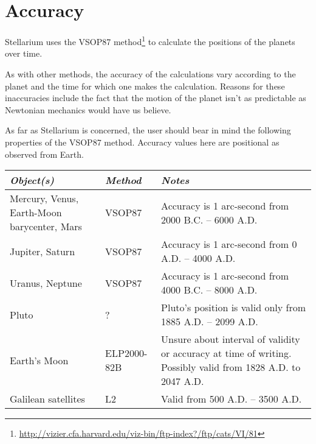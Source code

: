 


\chapter{Accuracy}
\label{ch:Accuracy}
Stellarium uses the VSOP87
method\footnote{\url{http://vizier.cfa.harvard.edu/viz-bin/ftp-index?/ftp/cats/VI/81}}
to calculate the positions of the planets over time.

As with other methods, the accuracy of the calculations vary according
to the planet and the time for which one makes the calculation. Reasons
for these inaccuracies include the fact that the motion of the planet
isn't as predictable as Newtonian mechanics would have us believe.

As far as Stellarium is concerned, the user should bear in mind the
following properties of the VSOP87 method. Accuracy values here are
positional as observed from Earth.

\begin{longtabu} to \textwidth {X|l|X}
\toprule
\emph{Object(s)} & \emph{Method} & \emph{Notes}\tabularnewline
\midrule
Mercury, Venus, Earth-Moon barycenter, Mars & VSOP87 & Accuracy is 1 arc-second from 2000 B.C. -- 6000 A.D.\\
\midrule
Jupiter, Saturn                             & VSOP87 & Accuracy is 1 arc-second from 0 A.D. -- 4000 A.D.\\
\midrule
Uranus, Neptune                             & VSOP87 & Accuracy is 1 arc-second from 4000 B.C. -- 8000 A.D.\\
\midrule
Pluto                                       & ?      & Pluto's position is valid only from 1885 A.D. -- 2099 A.D.\\
\midrule
Earth's Moon                                & ELP2000-82B & Unsure about interval of validity or accuracy at time of writing. Possibly valid from 1828 A.D. to 2047 A.D.\\
\midrule
Galilean satellites                         & L2     & Valid from 500 A.D. -- 3500 A.D.\\
\bottomrule
\end{longtabu}






